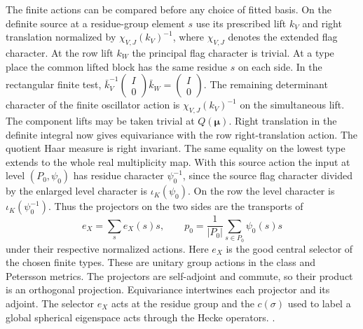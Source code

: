 The finite actions can be compared before any choice of fitted
basis. On the definite source at a residue-group element \(s\)
use its prescribed lift \(k_V\) and right translation normalized
by \(\chi_{V,J}(k_V)^{-1}\), where \(\chi_{V,J}\) denotes the
extended flag character. At the row lift \(k_W\) the principal
flag character is trivial. At a type place the common lifted
block has the same residue \(s\) on each side. In the rectangular
finite test, \(\bar k_V^{-1}\left(\begin{smallmatrix}I\\0\end{smallmatrix}\right)\bar k_W
=\left(\begin{smallmatrix}I\\0\end{smallmatrix}\right)\).
The remaining determinant character of the finite oscillator
action is \(\chi_{V,J}(k_V)^{-1}\) on the simultaneous lift.
The component lifts may be taken trivial at \(Q(\boldsymbol\mu)\).
Right translation in the definite integral now gives equivariance
with the row right-translation action. The quotient Haar measure
is right invariant. The same equality on the lowest type
extends to the whole real multiplicity map. With this source
action the input at level \((P_0,\psi_0)\) has residue
character \(\psi_0^{-1}\), since the source flag character
divided by the enlarged level character is \(\iota_K(\psi_0)\).
On the row the level character is \(\iota_K(\psi_0^{-1})\).
Thus the projectors on the two sides are the transports of
\[
 e_X=\sum_s e_X(s)s,\qquad
 p_0=\frac{1}{|P_0|}\sum_{s\in P_0}\psi_0(s)s
\]
under their respective normalized actions. Here \(e_X\)
is the good central selector of the chosen finite types.
These are unitary group actions in the class and Petersson
metrics. The projectors are self-adjoint and commute, so their
product is an orthogonal projection. Equivariance
intertwines each projector and its adjoint. The selector \(e_X\)
acts at the residue group and the \(c(\sigma)\) used to
label a global spherical eigenspace acts through the Hecke operators.
.

